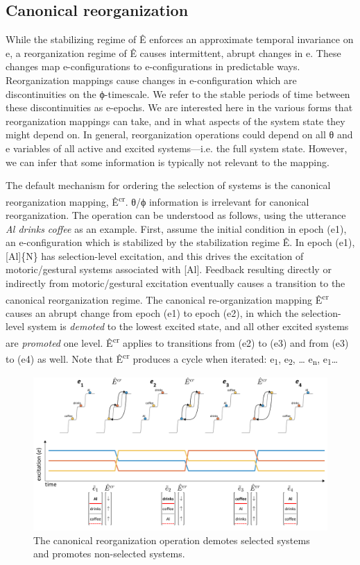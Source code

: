 \subsection{Canonical reorganization}

While the stabilizing regime of Ê enforces an approximate temporal invariance on e, a reorganization regime of Ê causes intermittent, abrupt changes in e. These changes map e-configurations to e-configurations in predictable ways. Reorganization mappings cause changes in e-configuration which are discontinuities on the ϕ-timescale. We refer to the stable periods of time between these discontinuities as e-epochs. We are interested here in the various forms that reorganization mappings can take, and in what aspects of the system state they might depend on. In general, reorganization operations could depend on all θ and e variables of all active and excited systems—i.e. the full system state. However, we can infer that some information is typically not relevant to the mapping. 

  The default mechanism for ordering the selection of systems is the canonical reorganization mapping, Ê\textsuperscript{cr}. θ/ϕ information is irrelevant for canonical reorganization. The operation  can be understood as follows, using the utterance \textit{Al drinks coffee} as an example. First, assume the initial condition in epoch (e1), an e-configuration which is stabilized by the stabilization regime Ê. In epoch (e1), [Al]\{N\} has selection-level excitation, and this drives the excitation of motoric/gestural systems associated with [Al]. Feedback resulting directly or indirectly from motoric/gestural excitation eventually causes a transition to the canonical reorganization regime. The canonical re-organization mapping Ê\textsuperscript{cr} causes an abrupt change from epoch (e1) to epoch (e2), in which the selection-level system is \textit{demoted} to the lowest excited state, and all other excited systems are \textit{promoted} one level. Ê\textsuperscript{cr} applies to transitions from (e2) to (e3) and from (e3) to (e4) as well. Note that Ê\textsuperscript{cr} produces a cycle when iterated: e\textsubscript{1}, e\textsubscript{2}, … e\textsubscript{n}, e\textsubscript{1}… 

  
\begin{figure}
\includegraphics[width=\textwidth]{figures/Tilsen-img25.png}
\caption{The canonical reorganization operation demotes selected systems and promotes non-selected systems.}
\label{fig:2:18}
\end{figure}
 

